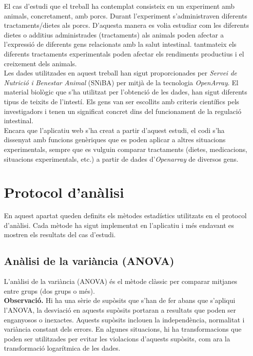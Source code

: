 \documentclass[english]{article}
\begin{document}
El cas d'estudi que el treball ha contemplat consisteix en un experiment amb animals, concretament, amb porcs. Durant l'experiment s'administraven diferents tractaments/dietes als porcs. D'aquesta manera es volia estudiar com les diferents dietes o additius administrades (tractaments) als animals poden afectar a l'expressió de diferents gens relacionats amb la salut intestinal. tantmateix els diferents tractaments experimentals poden afectar els rendiments productius i el creixement dels animals.
\\

Les dades utilitzades en aquest treball han sigut proporcionades per \textit{Servei de Nutrició i Benestar Animal} (SNiBA) per mitjà de la tecnologia \textit{OpenArray}. El material biològic que s'ha utilitzat per l'obtenció de les dades, han sigut diferents tipus de teixits de l'intestí. Els gens van ser escollits amb criteris científics pels investigadors i tenen un significat concret dins del funcionament de la regulació intestinal.
\\

Encara que l'aplicatiu web s'ha creat a partir d'aquest estudi, el codi s'ha dissenyat amb funcions genèriques que es poden aplicar a altres situacions experimentals, sempre que es vulguin comparar tractaments (dietes, medicacions, situacions experimentals, etc.) a partir de dades d'\textit{Openarray} de diversos gens.

\section{Protocol d'anàlisi}
En aquest apartat queden definits els mètodes estadístics utilitzats en el protocol d'anàlisi. Cada mètode ha sigut implementat en l'aplicatiu i més endavant es mostren els resultats del cas d'estudi.
\subsection{Anàlisi de la variància (ANOVA)}
L'anàlisi de la variància (ANOVA) és el mètode clàssic per comparar mitjanes entre grups (dos grups o més).
\\

\noindent\textbf{Observació.} Hi ha una sèrie de supòsits que s'han de fer abans que s'apliqui l'ANOVA, la desviació en aquests supòsits portaran a resultats que poden ser enganyosos o inexactes. Aquests supòsits inclouen la independència, normalitat i variància constant dels errors. En algunes situacions, hi ha transformacions que poden ser utilitzades per evitar les violacions d'aquests supòsits, com ara la transformació logarítmica de les dades.
\\
\end{document}
